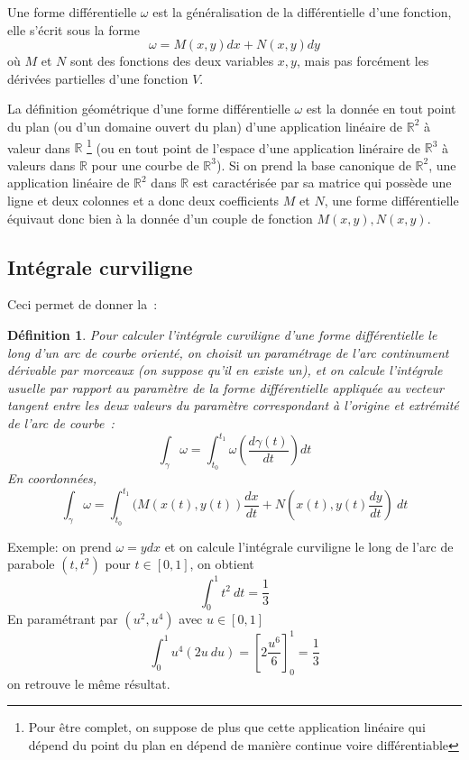 \documentclass[a4paper,11pt]{article}
\newtheorem{defn}[thm]{D\'efinition}
\newcommand{\R}{{\mathbb{R}}}
\begin{document}
Une forme 
diff\'erentielle
$\omega$ est la g\'en\'eralisation
de la diff\'erentielle d'une fonction, elle s'\'ecrit sous la forme
$$ \omega=M(x,y) dx + N(x,y) dy$$
o\`u $M$ et $N$ sont des fonctions 
des deux variables $x,y$, mais pas forc\'ement les d\'eriv\'ees
partielles d'une fonction $V$.
 
La d\'efinition g\'eom\'etrique d'une forme diff\'erentielle $\omega$
est la donn\'ee en tout point du plan (ou d'un domaine ouvert
du plan) d'une application lin\'eaire de $\R^2$ \`a valeur dans $\R$
\footnote{Pour \^etre complet, on suppose de plus que cette application
lin\'eaire qui d\'epend du point du plan en d\'epend de mani\`ere 
continue voire diff\'erentiable}
(ou en tout point de l'espace d'une application lin\'eraire de $\R^3$
\`a valeurs dans $\R$ pour une courbe de $\R^3$). 
Si on prend la base canonique de $\R^2$,
une application lin\'eaire de $\R^2$ dans $\R$ est caract\'eris\'ee
par sa matrice qui poss\`ede une ligne et deux colonnes et
a donc deux coefficients $M$ et $N$, une forme diff\'erentielle
\'equivaut donc bien \`a la donn\'ee d'un couple de fonction 
$M(x,y),N(x,y)$.

\subsection{Int\'egrale curviligne}
Ceci permet de donner la~:
\begin{defn}
Pour calculer l'int\'egrale 
curviligne
 d'une forme diff\'erentielle 
le long d'un arc de courbe orient\'e,
on choisit un param\'etrage de l'arc continument d\'erivable par morceaux
(on suppose qu'il en existe un), 
et on calcule l'int\'egrale usuelle par rapport au param\`etre
de la forme diff\'erentielle appliqu\'ee au vecteur tangent entre les
deux valeurs du param\`etre correspondant \`a l'origine
et extr\'emit\'e de l'arc de courbe~:
$$ \int_\gamma \omega = \int_{t_0}^{t_1}
\omega\left(\frac{d\gamma(t)}{dt}\right) dt $$
En coordonn\'ees,
$$ \int_\gamma \omega =\int_{t_0}^{t_1} 
(M(x(t),y(t)) \frac{dx}{dt} + N(x(t),y(t) \frac{dy}{dt}) \ dt$$
\end{defn}
Exemple: on prend $\omega=ydx$ et on calcule l'int\'egrale
curviligne le long de l'arc de parabole $(t,t^2)$ pour $t\in[0,1]$,
on obtient
$$ \int_0^1 t^2 \ dt =\frac13$$
En param\'etrant par $(u^2,u^4)$ avec $u\in[0,1]$
$$ \int_0^1 u^4 (2u \ du) = \left[2\frac{u^6}{6}\right]_0^1=\frac13$$
on retrouve le m\^eme r\'esultat.
\end{document}
